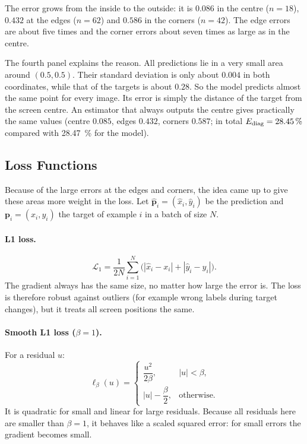 The error grows from the inside to the outside: it is $0.086$ in the centre
($n=18$), $0.432$ at the edges ($n=62$) and $0.586$ in the corners ($n=42$). The
edge errors are about five times and the corner errors about seven times as
large as in the centre.

The fourth panel explains the reason. All predictions lie in a very small area
around $(0.5, 0.5)$. Their standard deviation is only about $0.004$ in both
coordinates, while that of the targets is about $0.28$. So the model predicts
almost the same point for every image. Its error is simply the distance of the
target from the screen centre. An estimator that always outputs the centre gives
practically the same values (centre $0.085$, edges $0.432$, corners $0.587$; in
total $E_{\mathrm{diag}}=\SI{28.45}{\percent}$ compared with \SI{28.47}{\percent} for the
model).

\subsection{Loss Functions}
\label{sec:losses}

Because of the large errors at the edges and corners, the idea came up to give
these areas more weight in the loss. Let $\hat{\bm p}_i=(\hat x_i,\hat y_i)$ be
the prediction and $\bm p_i=(x_i,y_i)$ the target of example $i$ in a batch of
size $N$.

\paragraph{L1 loss.}
\begin{equation}
  \mathcal{L}_{1} = \frac{1}{2N}\sum_{i=1}^{N}\bigl(|\hat x_i-x_i| + |\hat y_i-y_i|\bigr).
\end{equation}
The gradient always has the same size, no matter how large the error is. The
loss is therefore robust against outliers (for example wrong labels during
target changes), but it treats all screen positions the same.

\paragraph{Smooth L1 loss ($\beta=1$).}
For a residual $u$:
\begin{equation}
  \ell_\beta(u) =
  \begin{cases}
    \dfrac{u^2}{2\beta}, & |u| < \beta,\\[1.2ex]
    |u| - \dfrac{\beta}{2}, & \text{otherwise.}
  \end{cases}
\end{equation}
It is quadratic for small and linear for large residuals. Because all residuals
here are smaller than $\beta=1$, it behaves like a scaled squared error: for
small errors the gradient becomes small.

